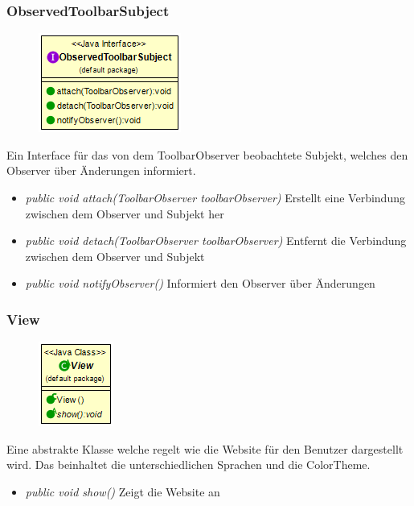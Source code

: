 \subsubsection{ObservedToolbarSubject}
\begin{minipage}{0.3\textwidth}
    \begin{figure}[H]
        \includegraphics[scale = 0.5
        ]{media/view/view/ObserverdToolbarSubject_Class.png}
    \end{figure}
    \end{minipage} \hfill
    \begin{minipage}{0.6\textwidth}
Ein Interface für das von dem ToolbarObserver beobachtete Subjekt, welches den Observer über Änderungen informiert.
\end{minipage}
\begin{itemize} [noitemsep]
    \item \emph{public void attach(ToolbarObserver toolbarObserver)} Erstellt eine Verbindung zwischen dem Observer und Subjekt her
    \item \emph{public void detach(ToolbarObserver toolbarObserver)} Entfernt die Verbindung zwischen dem Observer und Subjekt
    \item \emph{public void notifyObserver()} Informiert den Observer über Änderungen
\end{itemize}

\subsubsection{View}
\begin{minipage}{0.3\textwidth}
    \begin{figure}[H]
        \includegraphics[scale = 0.5
        ]{media/view/view/View_Class.png}
    \end{figure}
    \end{minipage} \hfill
    \begin{minipage}{0.6\textwidth}
Eine abstrakte Klasse welche regelt wie die Website für den Benutzer dargestellt wird. Das beinhaltet die unterschiedlichen Sprachen und die ColorTheme.
\end{minipage}
\begin{itemize} [noitemsep]
    \item \emph{public void show()} Zeigt die Website an
\end{itemize}

